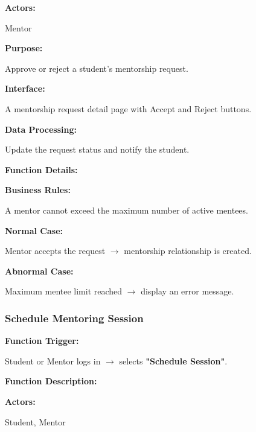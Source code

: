 \textbf{Actors:}

Mentor

\vspace{0.2cm}

\textbf{Purpose:}

Approve or reject a student's mentorship request.

\vspace{0.2cm}

\textbf{Interface:}

A mentorship request detail page with Accept and Reject buttons.

\vspace{0.2cm}

\textbf{Data Processing:}

Update the request status and notify the student.

\vspace{0.3cm}

\textbf{Function Details:}

\textbf{Business Rules:}

A mentor cannot exceed the maximum number of active mentees.

\textbf{Normal Case:}

Mentor accepts the request $\rightarrow$ mentorship relationship is created.

\textbf{Abnormal Case:}

Maximum mentee limit reached $\rightarrow$ display an error message.



\subsubsection{Schedule Mentoring Session}

\textbf{Function Trigger:}

Student or Mentor logs in $\rightarrow$ selects \textbf{"Schedule Session"}.

\vspace{0.3cm}

\textbf{Function Description:}

\textbf{Actors:}

Student, Mentor

\vspace{0.2cm}

